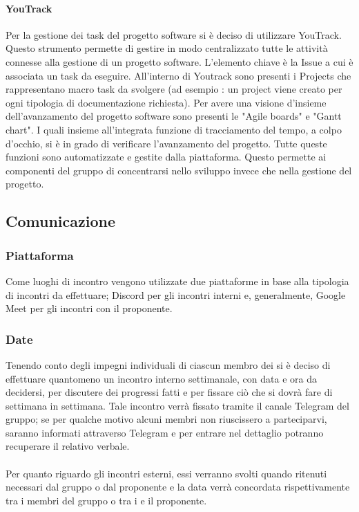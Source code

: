 \paragraph{YouTrack}
Per la gestione dei task del progetto software si è deciso di utilizzare YouTrack\glo{}.
Questo strumento permette di gestire in modo centralizzato tutte le attività connesse alla
gestione di un progetto software. L'elemento chiave è la Issue\glo{} a cui è associata un task da eseguire.
All'interno di Youtrack sono presenti i Projects che rappresentano macro task da svolgere (ad esempio : un project viene creato per ogni tipologia di documentazione richiesta).
Per avere una visione d'insieme dell'avanzamento del progetto software sono presenti le "Agile boards\glo{}" e "Gantt chart\glo{}". I quali insieme all'integrata funzione di tracciamento del tempo, a colpo d'occhio, si è in grado di verificare l'avanzamento del progetto.
Tutte queste funzioni sono automatizzate e gestite dalla piattaforma. Questo permette ai componenti del gruppo di concentrarsi nello sviluppo invece che nella gestione del progetto.

\subsection{Comunicazione}
\subsubsection{Piattaforma}
Come luoghi di incontro vengono utilizzate due piattaforme in base alla tipologia di incontri da effettuare; Discord\glo{} per gli incontri interni e, generalmente, Google Meet\glo{} per gli incontri con il proponente.

\subsubsection{Date}
Tenendo conto degli impegni individuali di ciascun membro dei \groupName{} si è deciso di effettuare quantomeno un incontro interno settimanale, con data e ora da decidersi, per discutere dei progressi fatti e per fissare ciò che si dovrà fare di settimana in settimana. Tale incontro verrà fissato tramite il canale Telegram\glo{} del gruppo; se per qualche motivo alcuni membri non riuscissero a parteciparvi, saranno informati attraverso Telegram e per entrare nel dettaglio potranno recuperare il relativo verbale.
\\ \\
Per quanto riguardo gli incontri esterni, essi verranno svolti quando ritenuti necessari dal gruppo o dal proponente e la data verrà concordata rispettivamente tra i membri del gruppo o tra i \groupName{} e il proponente. 

